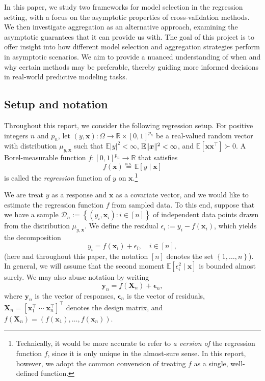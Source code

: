 \documentclass[11pt, letter paper]{article}
\newcommand{\1}{\mathmybb{1}}
\newcommand{\R}{\mathbb{R}}
\newcommand{\0}{\emptyset}
\newcommand{\E}{\mathbb{E}}
\newcommand{\Ep}[1]{\mathbb{E}\left[ #1 \right]}
\newcommand{\paren}[1]{\left(#1 \right)}
\newcommand{\set}[1]{\left\{ #1 \right\}}
\newcommand{\norm}[1]{|\hspace{-1pt}|#1 |\hspace{-1pt}|}
\newcommand{\normsq}[1]{\norm{#1}^{2}}
\newcommand{\data}{\mathcal{D}_{n}}
\newcommand{\aseq}{\stackrel{\mathrm{a.s.}}{=}}
\newcommand{\X}{\boldsymbol{X}}
\newcommand{\x}{\boldsymbol{x}}
\newcommand{\y}{\boldsymbol{y}}
\newcommand{\bepsilon}{\boldsymbol{\epsilon}}
\begin{document}
In this paper, we study two frameworks for model selection in the regression setting, with a focus on the asymptotic properties of cross-validation methods. We then investigate aggregation as an alternative approach, examining the asymptotic guarantees that it can provide us with. 
The goal of this project is to offer insight into how different model selection and aggregation strategies perform in asymptotic scenarios. We aim to provide a nuanced understanding of when and why certain methods may be preferable, thereby guiding more informed decisions in real-world predictive modeling tasks.

\subsection{Setup and notation}\label{sec:setup}

Throughout this report, we consider the following regression setup. For positive integers \(n\) and \(p_{n}\), let \((y, \x):\Omega\to\R\times{[0,1]}^{p_{n}}\) be a real-valued random vector with distribution \(\mu_{y, \x}\) such that \(\E{|y|^{2}}<\infty\), \(\E\normsq{\x}<\infty\), and \(\Ep{\x\x^{\top}}\succ 0\). A Borel-measurable function \(f:{[0,1]}^{p_{n}} \to \R\) that satisfies
\begin{equation}\label{eq:setup}
    f(\x) \aseq \Ep{y\mid \x}
\end{equation}
is called the \emph{regression} function of \(y\) on \(\x\).\footnote{Technically, it would be more accurate to refer to \emph{a version of} the regression function \(f\), since it is only unique in the almost-sure sense. In this report, however, we adopt the common convension of treating \(f\) as a single, well-defined function.}

We are treat \(y\) as a response and \(\x\) as a covariate vector, and we would like to estimate the regression function \(f\) from sampled data. To this end, suppose that we have a sample \(\data := \set{\paren{y_{i}, \x_{i}}:i\in [n]}\) of independent data points drawn from the distribution \(\mu_{y, \x}\). We define the residual \(\epsilon_{i}:= y_{i} - f(\x_{i})\), which yields the decomposition
\[y_{i} = f(\x_{i}) + \epsilon_{i}, \quad i\in[n],\]
(here and throughout this paper, the notation \([n]\) denotes the set \(\set{1, \ldots, n}\)).
In general, we will assume that the second moment \(\Ep{\epsilon^{2}_{i}\mid\x}\) is bounded almost surely. We may also abuse notation by writing
\[\y_{n} = f(\X_{n}) + \bepsilon_{n},\]
where  \(\y_{n}\) is the vector of responses, \(\bepsilon_{n}\) is the vector of residuals, \(\X_{n} = {[\x_{1}^{\top}\;\cdots\;\x_{n}^{\top}]}^{\top}\) denotes the design matrix, and \(f(\X_{n}) = (f(\x_{1}),\ldots,f(\x_{n}))\).
\end{document}
